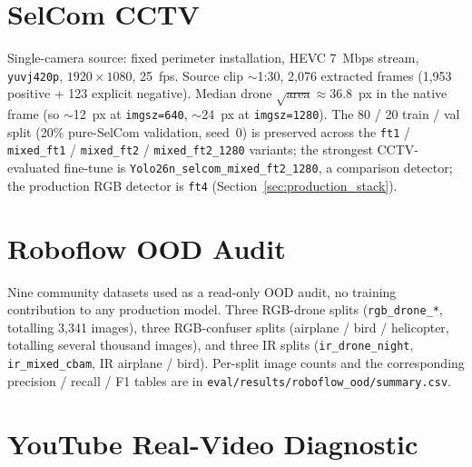\section{SelCom CCTV}

Single-camera source: fixed perimeter installation, HEVC 7~Mbps stream, \texttt{yuvj420p}, $1920{\times}1080$, 25~fps. Source clip $\sim$1:30, 2{,}076 extracted frames (1{,}953 positive + 123 explicit negative). Median drone $\sqrt{\text{area}} \approx 36.8$~px in the native frame (so $\sim$12~px at \texttt{imgsz=640}, $\sim$24~px at \texttt{imgsz=1280}). The 80 / 20 train / val split (20\% pure-SelCom validation, seed~0) is preserved across the \texttt{ft1} / \texttt{mixed\_ft1} / \texttt{mixed\_ft2} / \texttt{mixed\_ft2\_1280} variants; the strongest CCTV-evaluated fine-tune is \texttt{Yolo26n\_selcom\_mixed\_ft2\_1280}, a comparison detector; the production RGB detector is \texttt{ft4} (Section~\ref{sec:production_stack}).

\section{Roboflow OOD Audit}

Nine community datasets used as a read-only OOD audit, no training contribution to any production model. Three RGB-drone splits (\texttt{rgb\_drone\_*}, totalling 3{,}341 images), three RGB-confuser splits (airplane / bird / helicopter, totalling several thousand images), and three IR splits (\texttt{ir\_drone\_night}, \texttt{ir\_mixed\_cbam}, IR airplane / bird). Per-split image counts and the corresponding precision / recall / F1 tables are in \texttt{eval/results/roboflow\_ood/summary.csv}.

\section{YouTube Real-Video Diagnostic}

